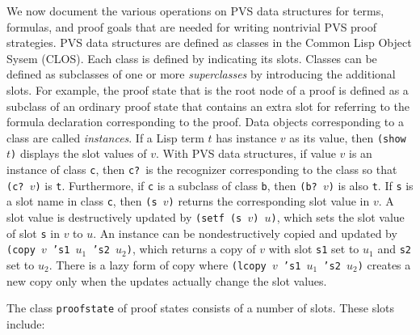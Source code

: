 \documentclass[12pt]{book}
\begin{document}
We now document the various operations on PVS data structures for terms,
formulas, 
and proof goals that are needed for writing nontrivial PVS proof
strategies.  PVS data structures are defined as classes in the Common Lisp
Object Sysem (CLOS).  Each class is defined by indicating its slots.
Classes can be defined as subclasses of one or more \emph{superclasses}
by introducing the additional slots.  For example, the proof state
that is the root node of a proof is defined as a subclass of an ordinary
proof state that contains an extra slot for referring to the formula
declaration corresponding to the 
proof.  Data objects corresponding to a class are called \emph{instances}\@.  If a Lisp term $t$ has instance $v$ as its value, then
\texttt{(show \(t\))} displays the slot values of $v$\@.  With PVS
data structures, if value $v$ is an instance of class \texttt{c}, then
\texttt{c?}\ is the recognizer corresponding to the class so that
\texttt{(c?~\(v\))} is \texttt{t}.  Furthermore, if \texttt{c} is a subclass of
class \texttt{b}, then \texttt{(b?~\(v\))} is also \texttt{t}\@.  If \texttt{s} is a
slot name in class \texttt{c}, then \texttt{(s \(v\))} returns the corresponding
slot value in $v$\@.    A slot value is destructively updated by
\texttt{(setf (s \(v\)) \(u\))}, which sets the slot value of slot \texttt{s}
in $v$ to $u$\@.  An instance can be nondestructively copied and updated
by \texttt{(copy \(v\) 's1 \(u_1\) 's2 \(u_2\))}, which returns a copy of
$v$ with slot \texttt{s1} set to $u_1$ and \texttt{s2} set to $u_2$\@.
There is a lazy form of copy where \texttt{(lcopy \(v\) 's1 \(u_1\) 's2
\(u_2\))}  creates a new copy only when the updates actually change
the slot values.

The class \texttt{proofstate} of proof states consists of a number of slots.
These slots include:
\end{document}
